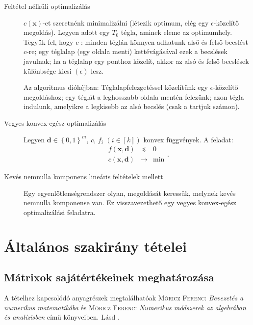 \documentclass[DIV=15,appendixprefix]{scrreprt}
\theoremstyle{definition}
\theoremstyle{remark}
\begin{document}
%
\begin{description}
	\item[Feltétel nélküli optimalizálás] $ c \left( \mathbf{ x } \right) $-et szeretnénk
		minimalizálni (létezik optimum, elég egy $ \epsilon $-kö\-ze\-lí\-tő megoldás). Legyen adott egy
		$ T_{ 0 } $ tégla, aminek eleme az optimumhely. Tegyük fel, hogy $ c $ : minden
		téglán könnyen adhatunk alső és felső becslést $ c $-re; egy téglalap (egy oldala menti)
		kettévágásával ezek a becslések javulnak; ha a téglalap egy ponthoz közelít, akkor az alsó
		és felső becslések különbsége kicsi $ \left( \epsilon \right) $ lesz.

		Az algoritmus dióhéjban: Téglalapfelezgetéssel közelítünk egy $ \epsilon $-közelítő
		megoldáshoz; egy téglát a leghosszabb oldala mentén felezünk; azon tégla 
		indulunk, amelyikre a legkisebb az alsó becslés (csak a  tartjuk számon).
	\item[Vegyes konvex-egész optimalizálás] Legyen $ \mathbf{ d } \in \left\{ 0,{} 1
		\right\}^{ m } $, $ c $, $ f_{ i } $ $ \left( i \in \left[ k \right] \right) $ konvex függvények. A feladat:
		\begin{equation*}
			\begin{array}{rcl}
				f \left( \mathbf{ x },{} \mathbf{ d } \right) 	&	\preceq			& 0\\
				\hline
				c \left( \mathbf{ x },{} \mathbf{ d } \right) 	&	\rightarrow	&	\min
			\end{array}.
		\end{equation*}
	\item[Kevés nemnulla komponens lineáris feltételek mellett] Egy egyenlőtlenségrendszer olyan,
	megoldását keressük, melynek kevés nemnulla komponense van. Ez visszavezethető egy vegyes
	konvex-egész optimalizálási feladatra.
\end{description}
%
%
%
\chapter{Általános szakirány tételei}
%
\section{Mátrixok sajátértékeinek meghatározása}
%
A tételhez kapcsolódó anyagrészek megtalálhatóak \textsc{Móricz Ferenc}: \emph{Bevezetés a numerikus
matematikába} \cite{Moricz2008} és \textsc{Móricz Ferenc}: \emph{Numerikus módszerek az algebrában
és analízisben} \cite{Moricz1997} című könyveiben.
%
Lásd \cite[I. fejezet, 1. szakasz]{Moricz1997}.
\end{document}
